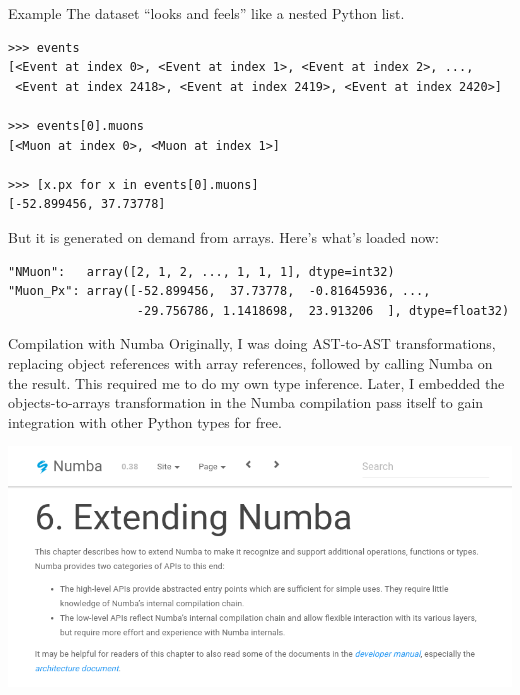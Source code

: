 \documentclass[aspectratio=169]{beamer}
\begin{document}
\begin{frame}[fragile]{Example}
\vspace{0.5 cm}
\small
{\normalsize The dataset ``looks and feels'' like a nested Python list.}
\begin{verbatim}
>>> events
[<Event at index 0>, <Event at index 1>, <Event at index 2>, ...,
 <Event at index 2418>, <Event at index 2419>, <Event at index 2420>]

>>> events[0].muons
[<Muon at index 0>, <Muon at index 1>]

>>> [x.px for x in events[0].muons]
[-52.899456, 37.73778]
\end{verbatim}

\vspace{0.5 cm}
{\normalsize But it is generated on demand from arrays. Here's what's loaded now:}
\begin{verbatim}
"NMuon":   array([2, 1, 2, ..., 1, 1, 1], dtype=int32)
"Muon_Px": array([-52.899456,  37.73778,  -0.81645936, ...,
                  -29.756786, 1.1418698,  23.913206  ], dtype=float32)
\end{verbatim}
\end{frame}

\begin{frame}{Compilation with Numba}
\vspace{0.5 cm}
Originally, I was doing AST-to-AST transformations, replacing object references with array references, followed by calling Numba on the result. This required me to do my own type inference. Later, I embedded the objects-to-arrays transformation in the Numba compilation pass itself to gain integration with other Python types for free.

\begin{center}
\includegraphics[width=0.8\linewidth]{extending-numba.png}
\end{center}
\end{frame}
\end{document}
